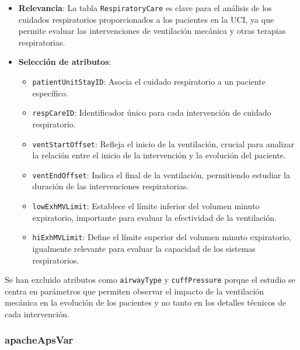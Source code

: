 \documentclass[12pt, a4paper, twoside]{article}
\begin{document}
	\begin{itemize}
		\item \textbf{Relevancia}: La tabla \texttt{RespiratoryCare} es clave para el análisis de los cuidados respiratorios proporcionados a los pacientes en la UCI, ya que permite evaluar las intervenciones de ventilación mecánica y otras terapias respiratorias.
		
		\item \textbf{Selección de atributos}:
		\begin{itemize}
			\item \texttt{patientUnitStayID}: Asocia el cuidado respiratorio a un paciente específico.
			\item \texttt{respCareID}: Identificador único para cada intervención de cuidado respiratorio.
			\item \texttt{ventStartOffset}: Refleja el inicio de la ventilación, crucial para analizar la relación entre el inicio de la intervención y la evolución del paciente.
			\item \texttt{ventEndOffset}: Indica el final de la ventilación, permitiendo estudiar la duración de las intervenciones respiratorias.
			\item \texttt{lowExhMVLimit}: Establece el límite inferior del volumen minuto expiratorio, importante para evaluar la efectividad de la ventilación.
			\item \texttt{hiExhMVLimit}: Define el límite superior del volumen minuto expiratorio, igualmente relevante para evaluar la capacidad de los sistemas respiratorios.
		\end{itemize}
		
	\end{itemize}
	
	Se han excluido atributos como \texttt{airwayType} y \texttt{cuffPressure} porque el estudio se centra en parámetros que permiten observar el impacto de la ventilación mecánica en la evolución de los pacientes y no tanto en los detalles técnicos de cada intervención.\cite{eICU2024}
	
	\subsubsection{apacheApsVar}
	
\end{document}
